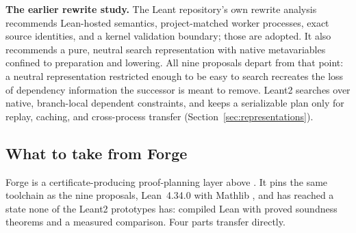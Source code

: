 \textbf{The earlier rewrite study.} The Leant repository's own rewrite analysis recommends Lean-hosted semantics, project-matched worker processes, exact source identities, and a kernel validation boundary; those are adopted. It also recommends a pure, neutral search representation with native metavariables confined to preparation and lowering. All nine proposals depart from that point: a neutral representation restricted enough to be easy to search recreates the loss of dependency information the successor is meant to remove. Leant2 searches over native, branch-local dependent constraints, and keeps a serializable plan only for replay, caching, and cross-process transfer (Section~\ref{sec:representations}).

\subsection{What to take from Forge}\label{sec:forge}

Forge \cite{forge} is a certificate-producing proof-planning layer above . It pins the same toolchain as the nine proposals, Lean~4.34.0 with Mathlib , and has reached a state none of the Leant2 prototypes has: compiled Lean with proved soundness theorems and a measured comparison. Four parts transfer directly.


